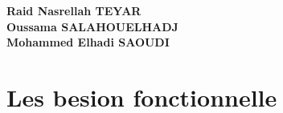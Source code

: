 \documentclass[a4paper,12p]{article}
\begin{document}


     \begin{center}
        \textbf{Raid Nasrellah TEYAR} \\
        \textbf{Oussama SALAHOUELHADJ} \\
        \textbf{Mohammed Elhadi SAOUDI} \\
    \end{center}

     \raggedright\section{Les besion fonctionnelle}

    
\end{document}
